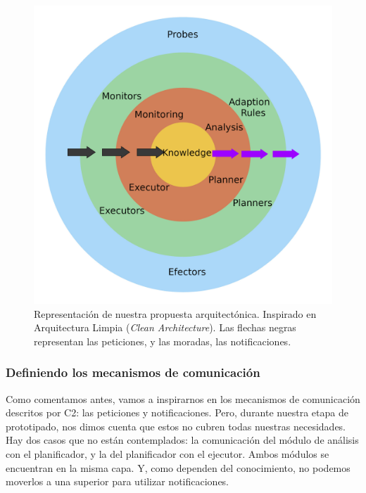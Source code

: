 \begin{figure}[htb]
  \centering
  \includegraphics[scale=0.45]{cap_arquitectura/images/clean-arch-2-MAPEK-style-small}
  \caption[Representación de nuestra propuesta arquitectónica. Inspirado en Arquitectura Limpia (\emph{Clean Architecture}). Las flechas negras representan las peticiones, y las moradas, las notificaciones.]{Representación de nuestra propuesta arquitectónica. Inspirado en Arquitectura Limpia (\emph{Clean Architecture}). Las flechas negras representan las peticiones, y las moradas, las notificaciones. \footnotemark }
  \label{fig:clean-mapek-architecture}
\end{figure}


\subsubsection{Definiendo los mecanismos de comunicación}

Como comentamos antes, vamos a inspirarnos en los mecanismos de comunicación descritos por C2: las peticiones y notificaciones. Pero, durante nuestra etapa de prototipado, nos dimos cuenta que estos no cubren todas nuestras necesidades. Hay dos casos que no están contemplados: la comunicación del módulo de análisis con el planificador, y la del planificador con el ejecutor. Ambos módulos se encuentran en la misma capa. Y, como dependen del conocimiento, no podemos moverlos a una superior para utilizar notificaciones.


